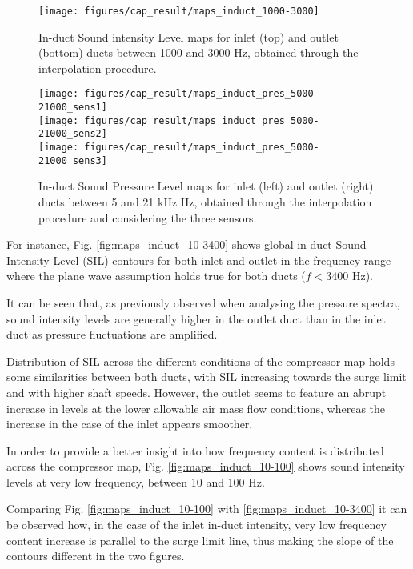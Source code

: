 \begin{figure}[tbh!]
\centering
\texttt{[image: figures/cap\_result/maps\_induct\_1000-3000]}
\vspace{-2.25cm}
\caption{In-duct Sound intensity Level maps for inlet (top) and outlet (bottom) ducts between 1000 and 3000 Hz, obtained through the interpolation procedure.}
\label{fig:maps_induct_1000-3000}
\end{figure}

\begin{figure}[tbh!]
\centering
\texttt{[image: figures/cap\_result/maps\_induct\_pres\_5000-21000\_sens1]}\\[4mm]
\texttt{[image: figures/cap\_result/maps\_induct\_pres\_5000-21000\_sens2]}\\[4mm]
\texttt{[image: figures/cap\_result/maps\_induct\_pres\_5000-21000\_sens3]}
\caption{In-duct Sound Pressure Level maps for inlet (left) and outlet (right) ducts between 5 and 21 kHz Hz, obtained through the interpolation procedure and considering the three sensors.}
\label{fig:maps_induct_SPL_3sens}
\end{figure}

For instance, Fig. \ref{fig:maps_induct_10-3400} shows global in-duct Sound Intensity Level (SIL) contours for both inlet and outlet in the frequency range where the plane wave assumption holds true for both ducts ($f<3400$ Hz). 

It can be seen that, as previously observed when analysing the pressure spectra, sound intensity levels are generally higher in the outlet duct than in the inlet duct as pressure fluctuations are amplified. 

Distribution of SIL across the different conditions of the compressor map holds some similarities between both ducts, with SIL increasing towards the surge limit and with higher shaft speeds. However, the outlet seems to feature an abrupt increase in levels at the lower allowable air mass flow conditions, whereas the increase in the case of the inlet appears smoother. 

In order to provide a better insight into how frequency content is distributed across the compressor map, Fig. \ref{fig:maps_induct_10-100} shows sound intensity levels at very low frequency, between 10 and 100 Hz.

Comparing Fig. \ref{fig:maps_induct_10-100} with \ref{fig:maps_induct_10-3400} it can be observed how, in the case of the inlet in-duct intensity, very low frequency content increase is parallel to the surge limit line, thus making the slope of the contours different in the two figures.

